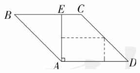 \begin{figure}

    \includegraphics[width=1\linewidth]{figure/p3.png}
    \caption{}
    \label{fig:p3}
    
\end{figure}

